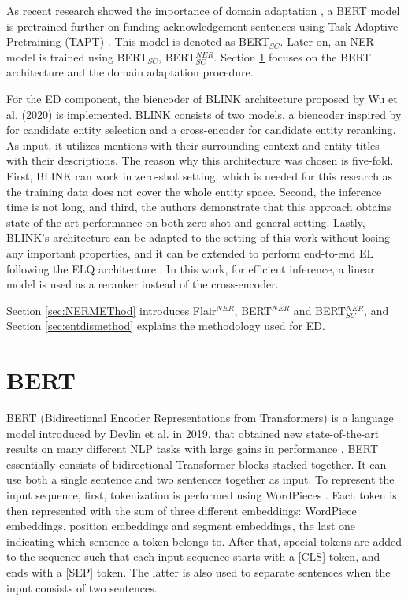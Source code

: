 \documentclass{report}
\theoremstyle{definition}
\theoremstyle{remark}
\begin{document}
As recent research showed the importance of domain adaptation \cite{DontStop,exBERT,quote3}, a BERT model is pretrained further on funding acknowledgement sentences using Task-Adaptive Pretraining (TAPT) \cite{DontStop}. This model is denoted as BERT$_{SC}$. Later on, an NER model is trained using BERT$_{SC}$, BERT$_{SC}^{NER}$. Section \ref{sec:BERT} focuses on the BERT architecture and the domain adaptation procedure.

For the ED component, the biencoder of BLINK architecture proposed by Wu et al. (2020) \cite{scalablezeroshot} is implemented. BLINK consists of two models, a biencoder inspired by \cite{polyencoder} for candidate entity selection and a cross-encoder \cite{polyencoder} for candidate entity reranking. As input, it utilizes mentions with their surrounding context and entity titles with their descriptions. The reason why this architecture was chosen is five-fold. First, BLINK can work in zero-shot setting, which is needed for this research as the training data does not cover the whole entity space. Second, the inference time is not long, and third, the authors demonstrate that this approach obtains state-of-the-art performance on both zero-shot and general setting. Lastly, BLINK's architecture can be adapted to the setting of this work without losing any important properties, and it can be extended to perform end-to-end EL following the ELQ architecture \cite{elq}. In this work, for efficient inference, a linear model is used as a reranker instead of the cross-encoder.

Section \ref{sec:NERMEThod} introduces Flair$^{NER}$, BERT$^{NER}$ and BERT$_{SC}^{NER}$, and Section \ref{sec:entdismethod} explains the methodology used for ED.

\section{BERT}
\label{sec:BERT}

BERT (Bidirectional Encoder Representations from
Transformers) is a language model introduced by Devlin et al. in 2019, that obtained new state-of-the-art results on many different NLP tasks with large gains in performance \cite{BERT}. BERT essentially consists of bidirectional Transformer \cite{transformer} blocks stacked together. It can use both a single sentence and two sentences together as input. To represent the input sequence, first, tokenization is performed using WordPieces \cite{wordpiece}. Each token is then represented with the sum of three different embeddings: WordPiece embeddings, position embeddings and segment embeddings, the last one indicating which sentence a token belongs to. After that, special tokens are added to the sequence such that each input sequence starts with a [CLS] token, and ends with a [SEP] token. The latter is also used to separate sentences when the input consists of two sentences. 
\end{document}
